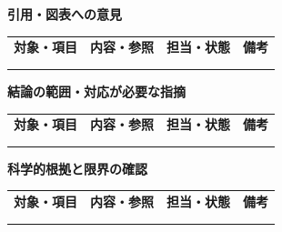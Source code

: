 \documentclass[11pt,a4paper]{article}
\begin{document}
\par{}\noindent\textbf{引用・図表への意見}\par\vspace{1mm}
{\fontsize{8.5}{13}\selectfont
\begin{tabularx}{\linewidth}{@{}XXXX@{}}
\textbf{対象・項目} & \textbf{内容・参照} & \textbf{担当・状態} & \textbf{備考}\\[2mm]
\strut & \strut & \strut & \strut\\[5mm]
\strut & \strut & \strut & \strut\\[5mm]
\end{tabularx}
}\vspace{2mm}\par
{}
\par{}\noindent\textbf{結論の範囲・対応が必要な指摘}\par\vspace{1mm}
{\fontsize{8.5}{13}\selectfont
\begin{tabularx}{\linewidth}{@{}XXXX@{}}
\textbf{対象・項目} & \textbf{内容・参照} & \textbf{担当・状態} & \textbf{備考}\\[2mm]
\strut & \strut & \strut & \strut\\[5mm]
\strut & \strut & \strut & \strut\\[5mm]
\end{tabularx}
}\vspace{2mm}\par
{}
\par{}\noindent\textbf{科学的根拠と限界の確認}\par\vspace{1mm}
{\fontsize{8.5}{13}\selectfont
\begin{tabularx}{\linewidth}{@{}XXXX@{}}
\textbf{対象・項目} & \textbf{内容・参照} & \textbf{担当・状態} & \textbf{備考}\\[2mm]
\strut & \strut & \strut & \strut\\[5mm]
\strut & \strut & \strut & \strut\\[5mm]
\end{tabularx}
}\vspace{2mm}\par
\end{document}
